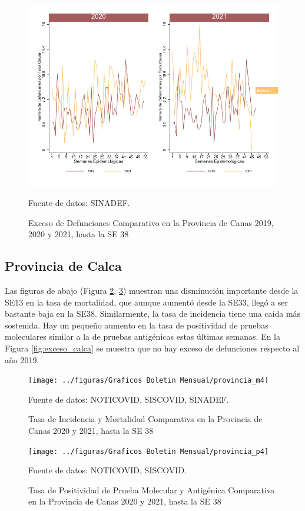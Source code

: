\documentclass[12pt,a4paper,openany]{book}
\begin{document}
	\begin{figure}[h]
		\caption{Exceso de Defunciones Comparativo en la Provincia de Canas 2019, 2020 y 2021, hasta la SE 38}\label{fig:exceso_canas}
		\begin{center}
			\includegraphics[width=0.7\linewidth]{../figuras/exceso_3}
		\end{center}
		{\footnotesize {Fuente de datos: SINADEF.}}
	\end{figure}

\clearpage

	\subsection*{Provincia de Calca}
	\noindent Las figuras de abajo (Figura \ref{fig:inc_mort_calca}, \ref{fig:positividad_calca})  muestran una disminución importante desde la SE13 en la tasa de mortalidad, que aunque aumentó desde la SE33, llegó a ser bastante baja en la SE38. Similarmente, la tasa de incidencia tiene una caída más sostenida. Hay un pequeño aumento en la tasa de positividad de pruebas moleculares similar a la de pruebas antigénicas estas últimas semanas. En la Figura \ref{fig:exceso_calca} se muestra que no hay exceso de defunciones respecto al año 2019.

	\begin{figure}[h]
	\caption{Tasa de Incidencia y Mortalidad Comparativa en la Provincia de Canas 2020 y 2021, hasta la SE 38}\label{fig:inc_mort_calca}
	\begin{center}
		\texttt{[image: ../figuras/Graficos Boletin Mensual/provincia\_m4]}
	\end{center}
	{\footnotesize {Fuente de datos: NOTICOVID, SISCOVID, SINADEF.}}
	\end{figure}

	\begin{figure}[h]
	\caption{Tasa de Positividad de Prueba Molecular y Antigénica Comparativa en la Provincia de Canas 2020 y 2021, hasta la SE 38}\label{fig:positividad_calca}
	\begin{center}
		\texttt{[image: ../figuras/Graficos Boletin Mensual/provincia\_p4]}
	\end{center}
	{\footnotesize {Fuente de datos: NOTICOVID, SISCOVID.}}
	\end{figure}
\end{document}
